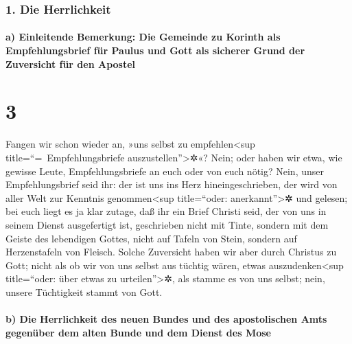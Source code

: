 \hypertarget{die-herrlichkeit}{%
\subsubsection{1. Die Herrlichkeit}\label{die-herrlichkeit}}

\hypertarget{a-einleitende-bemerkung-die-gemeinde-zu-korinth-als-empfehlungsbrief-fuxfcr-paulus-und-gott-als-sicherer-grund-der-zuversicht-fuxfcr-den-apostel}{%
\paragraph{a) Einleitende Bemerkung: Die Gemeinde zu Korinth als
Empfehlungsbrief für Paulus und Gott als sicherer Grund der Zuversicht
für den
Apostel}\label{a-einleitende-bemerkung-die-gemeinde-zu-korinth-als-empfehlungsbrief-fuxfcr-paulus-und-gott-als-sicherer-grund-der-zuversicht-fuxfcr-den-apostel}}

\hypertarget{section-2}{%
\section{3}\label{section-2}}

 Fangen wir schon wieder an, »uns selbst zu
empfehlen\textless sup title=``=~Empfehlungsbriefe
auszustellen''\textgreater✲«? Nein; oder haben wir etwa, wie gewisse
Leute, Empfehlungsbriefe an euch oder von euch nötig? 
Nein, unser Empfehlungsbrief seid ihr: der ist uns ins Herz
hineingeschrieben, der wird von aller Welt zur Kenntnis
genommen\textless sup title=``oder: anerkannt''\textgreater✲ und
gelesen;  bei euch liegt es ja klar zutage, daß ihr ein
Brief Christi seid, der von uns in seinem Dienst ausgefertigt ist,
geschrieben nicht mit Tinte, sondern mit dem Geiste des lebendigen
Gottes, nicht auf Tafeln von Stein, sondern auf Herzenstafeln von
Fleisch.  Solche Zuversicht haben wir aber durch Christus
zu Gott;  nicht als ob wir von uns selbst aus tüchtig
wären, etwas auszudenken\textless sup title=``oder: über etwas zu
urteilen''\textgreater✲, als stamme es von uns selbst; nein, unsere
Tüchtigkeit stammt von Gott.

\hypertarget{b-die-herrlichkeit-des-neuen-bundes-und-des-apostolischen-amts-gegenuxfcber-dem-alten-bunde-und-dem-dienst-des-mose}{%
\paragraph{b) Die Herrlichkeit des neuen Bundes und des apostolischen
Amts gegenüber dem alten Bunde und dem Dienst des
Mose}\label{b-die-herrlichkeit-des-neuen-bundes-und-des-apostolischen-amts-gegenuxfcber-dem-alten-bunde-und-dem-dienst-des-mose}}


